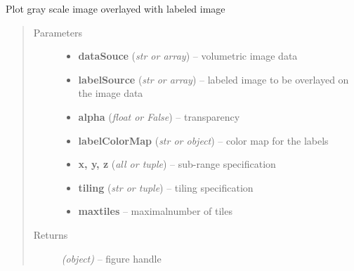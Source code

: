 \documentclass[letterpaper,10pt,english]{sphinxmanual}
\begin{document}
\begin{fulllineitems}
\label{api/ClearMap.Visualization:ClearMap.Visualization.Plot.plotOverlayLabel}
Plot gray scale image overlayed with labeled image
\begin{quote}\begin{description}
\item[{Parameters}] \leavevmode\begin{itemize}
\item {} 
\textbf{dataSouce} (\emph{str or array}) --
volumetric image data

\item {} 
\textbf{labelSource} (\emph{str or array}) --
labeled image to be overlayed on the image data

\item {} 
\textbf{alpha} (\emph{float or False}) --
transparency

\item {} 
\textbf{labelColorMap} (\emph{str or object}) --
color map for the labels

\item {} 
\textbf{x, y, z} (\emph{all or tuple}) --
sub-range specification

\item {} 
\textbf{tiling} (\emph{str or tuple}) --
tiling specification

\item {} 
\textbf{maxtiles} --
maximalnumber of tiles

\end{itemize}

\item[{Returns}] \leavevmode
\emph{(object)} --
figure handle

\end{description}\end{quote}




{\hyperref[api/ClearMap.Visualization:ClearMap.Visualization.Plot.overlayLabel]{\emph{}}}



\end{fulllineitems}
\end{document}
